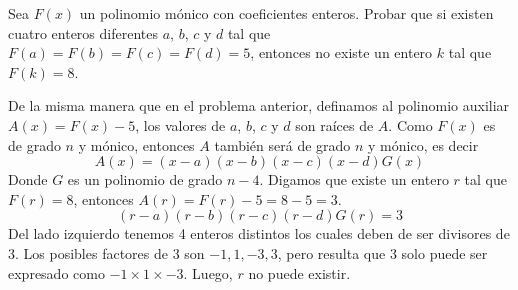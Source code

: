 \begin{section-problem}
    Sea $F(x)$ un polinomio mónico con coeficientes enteros.
    Probar que si existen cuatro enteros diferentes $a$, $b$, $c$ y $d$ tal que $F(a) = F(b) = F(c)  = F(d) = 5$,
    entonces no existe un entero $k$ tal que $F(k) = 8$.

    \begin{solution}
        De la misma manera que en el problema anterior, definamos al polinomio auxiliar $A(x) = F(x) - 5$, los valores de $a$, $b$, $c$ y $d$ son raíces de $A$.
        Como $F(x)$ es de grado $n$ y mónico, entonces $A$ también será de grado $n$ y mónico, es decir
        \[A(x) = (x - a)(x - b)(x - c)(x - d)G(x)\]
        Donde $G$ es un polinomio de grado $n - 4$.
        Digamos que existe un entero $r$ tal que $F(r) = 8$, entonces $A(r) = F(r) - 5 = 8 - 5 = 3$.
        \[(r - a)(r - b)(r - c)(r - d)G(r) = 3\]
        Del lado izquierdo tenemos 4 enteros distintos los cuales deben de ser divisores de 3.
        Los posibles factores de 3 son $-1, 1, -3, 3$, pero resulta que 3 solo puede ser expresado como $-1 \times 1 \times -3$.
        Luego, $r$ no puede existir.
    \end{solution}
\end{section-problem}

